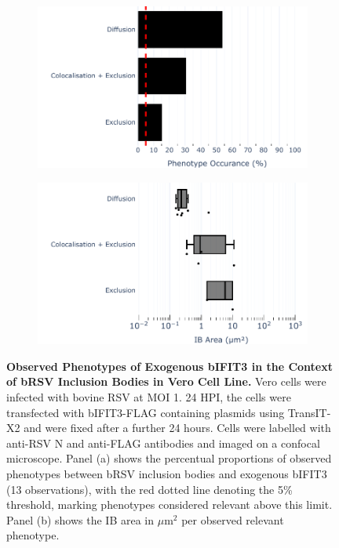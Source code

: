 \begin{figure}
    \begin{subfigure}{0.495\textwidth}
        \caption{}
        \includegraphics[width=1\linewidth]{09. Chapter 4/Figs/02. Overexpression/03. IFIT3/04. bar_i3_brsv.pdf} 
    \end{subfigure}
    \begin{subfigure}{0.495\textwidth}
        \caption{}
        \includegraphics[width=1\linewidth]{09. Chapter 4/Figs/02. Overexpression/03. IFIT3/05. box_i3_brsv.pdf}
    \end{subfigure}
    \caption[Observed Phenotypes of Exogenous bIFIT3 in the Context of bRSV Inclusion Bodies in Vero Cell Line.]{\textbf{Observed Phenotypes of Exogenous bIFIT3 in the Context of bRSV Inclusion Bodies in Vero Cell Line.} Vero cells were infected with bovine RSV at MOI 1. 24 HPI, the cells were transfected with bIFIT3-FLAG containing plasmids using TransIT-X2 and were fixed after a further 24 hours. Cells were labelled with anti-RSV N and anti-FLAG antibodies and imaged on a confocal microscope. Panel (a) shows the percentual proportions of observed phenotypes between bRSV inclusion bodies and exogenous bIFIT3 (13 observations), with the red dotted line denoting the 5\% threshold, marking phenotypes considered relevant above this limit. Panel (b) shows the IB area in \(\mu \mbox{m}^2\) per observed relevant phenotype.}
    \label{fig:Observed Phenotypes of Exogenous bIFIT3 in the Context of bRSV Inclusion Bodies in VERO Cell Line}
\end{figure}

